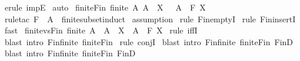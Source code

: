 \begin{isabellebody}
\isamarkupfalse%
\ {\isacharparenleft}erule\ impE{\isacharparenright}\isanewline
{}\isamarkupfalse%
\ auto\isanewline
{}\isamarkupfalse%
%
\endisatagproof
{\isafoldproof}%
%
\isadelimproof
\isanewline
%
\endisadelimproof
\isanewline
{}\isamarkupfalse%
\ finite{\isacharunderscore}Fin{\isacharcolon}\ {\isachardoublequoteopen}{\isacharbrackleft}{\isacharbar}finite\ A{\isacharsemicolon}\ A\ {\isacharless}{\isacharequal}\ X\ {\isacharbar}{\isacharbrackright}\ {\isacharequal}{\isacharequal}{\isachargreater}\ A\ {\isacharcolon}\ {\isacharpercent}F\ X{\isachardoublequoteclose}\isanewline
%
\isadelimproof
%
\endisadelimproof
%
\isatagproof
{}\isamarkupfalse%
\ {\isacharparenleft}rule{\isacharunderscore}tac\ F\ {\isacharequal}\ {\isachardoublequoteopen}A{\isachardoublequoteclose}\ \ finite{\isacharunderscore}subset{\isacharunderscore}induct{\isacharparenright}\isanewline
{}\isamarkupfalse%
\ assumption{\isacharplus}\isanewline
{}\isamarkupfalse%
\ {\isacharparenleft}rule\ Fin{\isachardot}emptyI{\isacharparenright}\isanewline
{}\isamarkupfalse%
\ {\isacharparenleft}rule\ Fin{\isachardot}insertI{\isacharparenright}\isanewline
{}\isamarkupfalse%
\ fast{\isacharplus}\isanewline
{}\isamarkupfalse%
%
\endisatagproof
{\isafoldproof}%
%
\isadelimproof
\isanewline
%
\endisadelimproof
\isanewline
{}\isamarkupfalse%
\ finite{\isacharunderscore}vs{\isacharunderscore}Fin{\isacharcolon}\ {\isachardoublequoteopen}{\isacharparenleft}finite\ A\ {\isacharampersand}\ A\ {\isacharless}{\isacharequal}\ X{\isacharparenright}\ {\isacharequal}\ {\isacharparenleft}A\ {\isacharcolon}\ {\isacharpercent}F\ X{\isacharparenright}{\isachardoublequoteclose}\isanewline
%
\isadelimproof
%
\endisadelimproof
%
\isatagproof
{}\isamarkupfalse%
\ {\isacharparenleft}rule\ iffI{\isacharparenright}\isanewline
{}\isamarkupfalse%
\ {\isacharparenleft}blast\ intro{\isacharcolon}\ Fin{\isacharunderscore}finite\ finite{\isacharunderscore}Fin{\isacharparenright}\isanewline
{}\isamarkupfalse%
\ {\isacharparenleft}rule\ conjI{\isacharparenright}\isanewline
{}\isamarkupfalse%
\ {\isacharparenleft}blast\ intro{\isacharbang}{\isacharcolon}\ Fin{\isacharunderscore}finite\ finite{\isacharunderscore}Fin\ FinD{\isacharparenright}\isanewline
{}\isamarkupfalse%
\ {\isacharparenleft}blast\ intro{\isacharbang}{\isacharcolon}\ Fin{\isacharunderscore}finite\ finite{\isacharunderscore}Fin\ FinD{\isacharparenright}\isanewline

\end{isabellebody}
